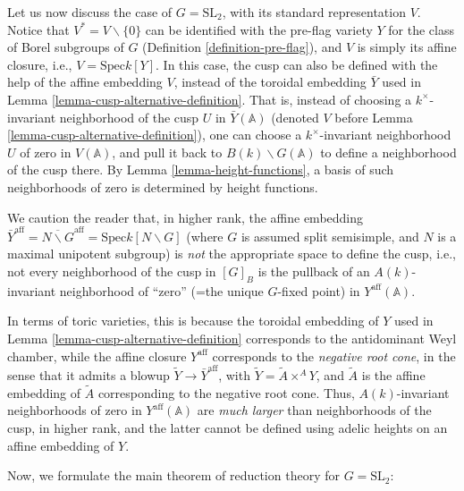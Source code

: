 Let us now discuss the case of $G=\text{SL}_2$, with its standard representation $V$. Notice that $V^*=V\smallsetminus\{0\}$ can be identified with the pre-flag variety $Y$ for the class of Borel subgroups of $G$ (Definition \ref{definition-pre-flag}), and $V$ is simply its affine closure, i.e., $V= \text{Spec} k[Y]$. In this case, the cusp can also be defined with the help of the affine embedding $V$, instead of the toroidal embedding $\bar Y$ used in Lemma \ref{lemma-cusp-alternative-definition}. That is, instead of choosing a $k^\times$-invariant neighborhood of the cusp $U$ in $\bar Y(\mathbb A)$ (denoted $V$ before Lemma \ref{lemma-cusp-alternative-definition}), one can choose a $k^\times$-invariant neighborhood $U$ of zero in $V(\mathbb A)$, and pull it back to $B(k)\backslash G(\mathbb A)$ to define a neighborhood of the cusp there. By Lemma \ref{lemma-height-functions}, a basis of such neighborhoods of zero is determined by height functions.


\begin{remark}
 \label{remark-basic-affine}
We caution the reader that, in higher rank, the affine embedding $\bar Y^{\text{aff}}=\overline{N\backslash G}^{\text{aff}} = \text{Spec} k[N\backslash G]$ (where $G$ is assumed split semisimple, and $N$ is a maximal unipotent subgroup) is \emph{not} the appropriate space to define the cusp, i.e., not every neighborhood of the cusp in $[G]_B$ is the pullback of an $A(k)$-invariant neighborhood of ``zero'' (=the unique $G$-fixed point) in $Y^{\text{aff}}(\mathbb A)$. 

In terms of toric varieties, this is because the toroidal embedding of $Y$ used in Lemma \ref{lemma-cusp-alternative-definition} corresponds to the antidominant Weyl chamber, while the affine closure $Y^{\text{aff}}$ corresponds to the \emph{negative root cone}, in the sense that it admits a blowup $\tilde Y \to \bar Y^{\text{aff}}$, with $\tilde Y = \tilde A\times^A Y$, and $\tilde A$ is the affine embedding of $\tilde A$ corresponding to the negative root cone. Thus, $A(k)$-invariant neighborhoods of zero in $Y^{\text{aff}}(\mathbb A)$ are \emph{much larger} than neighborhoods of the cusp, in higher rank, and the latter cannot be defined using adelic heights on an affine embedding of $Y$.
\end{remark}

Now, we formulate the main theorem of reduction theory for $G=\text{SL}_2$:

